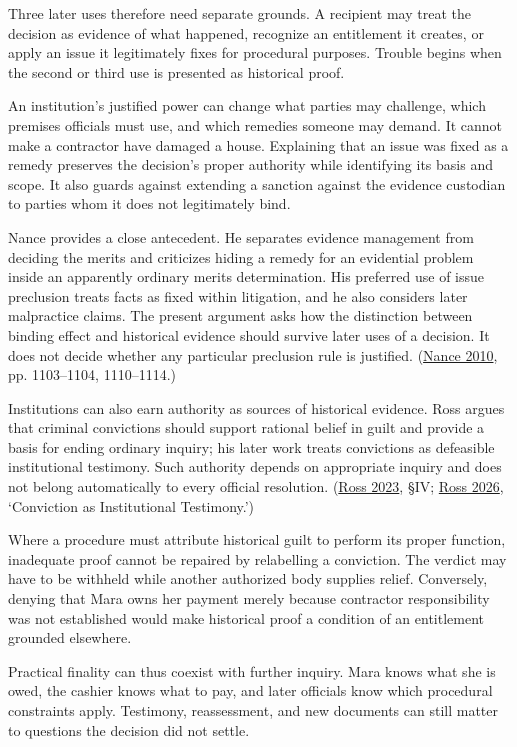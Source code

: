 Three later uses therefore need separate grounds. A recipient may treat the decision as evidence of what happened, recognize an entitlement it creates, or apply an issue it legitimately fixes for procedural purposes. Trouble begins when the second or third use is presented as historical proof.

An institution’s justified power can change what parties may challenge, which premises officials must use, and which remedies someone may demand. It cannot make a contractor have damaged a house. Explaining that an issue was fixed as a remedy preserves the decision’s proper authority while identifying its basis and scope. It also guards against extending a sanction against the evidence custodian to parties whom it does not legitimately bind.

Nance provides a close antecedent. He separates evidence management from deciding the merits and criticizes hiding a remedy for an evidential problem inside an apparently ordinary merits determination. His preferred use of issue preclusion treats facts as fixed within litigation, and he also considers later malpractice claims. The present argument asks how the distinction between binding effect and historical evidence should survive later uses of a decision. It does not decide whether any particular preclusion rule is justified. (\hyperlink{ref:nance2010}{Nance 2010}, pp. 1103–1104, 1110–1114.)

Institutions can also earn authority as sources of historical evidence. Ross argues that criminal convictions should support rational belief in guilt and provide a basis for ending ordinary inquiry; his later work treats convictions as defeasible institutional testimony. Such authority depends on appropriate inquiry and does not belong automatically to every official resolution. (\hyperlink{ref:ross2023}{Ross 2023}, §IV; \hyperlink{ref:ross2026}{Ross 2026}, ‘Conviction as Institutional Testimony.’)

Where a procedure must attribute historical guilt to perform its proper function, inadequate proof cannot be repaired by relabelling a conviction. The verdict may have to be withheld while another authorized body supplies relief. Conversely, denying that Mara owns her payment merely because contractor responsibility was not established would make historical proof a condition of an entitlement grounded elsewhere.

Practical finality can thus coexist with further inquiry. Mara knows what she is owed, the cashier knows what to pay, and later officials know which procedural constraints apply. Testimony, reassessment, and new documents can still matter to questions the decision did not settle.

